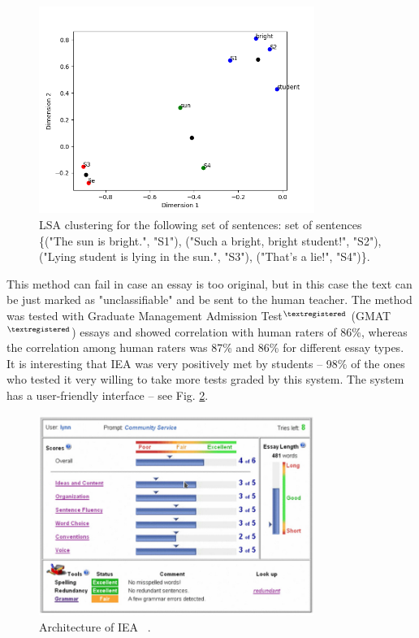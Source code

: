 \begin{itemize}
\begin{figure}[h!]
  \centering
  \includegraphics[width=0.8\textwidth]{img/LSAExample}
    \caption{LSA clustering for the following set of sentences: set of sentences \{("The sun is bright.", "S1"), ("Such a bright, bright student!", "S2"), ("Lying student is lying in the sun.", "S3"), ("That's a lie!", "S4")\}.\label{fig:LSAExample}}
\end{figure}

\end{itemize}

This method can fail in case an essay is too original, but in this case the text can be just marked as "unclassifiable" and be sent to the human teacher. The method was tested with Graduate Management Admission Test$^{\tiny{\textregistered}}$ (GMAT$^{\tiny{\textregistered}}$) essays and showed correlation with human raters of 86\%, whereas the correlation among human raters was 87\% and 86\% for different essay types. It is interesting that IEA was very positively met by students -- 98\% of the ones who tested it very willing to take more tests graded by this system. The system has a user-friendly interface -- see Fig. \ref{fig:IEAInt}. \\

\begin{figure}[h!]
  \centering
  \includegraphics[width=0.8\textwidth]{img/IEAInt}
    \caption{Architecture of IEA ~\cite{Dikli}.\label{fig:IEAInt}}
\end{figure}


